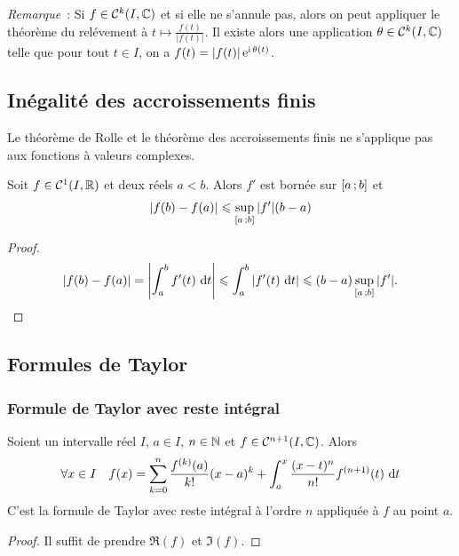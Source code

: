 \emph{Remarque}~: Si \(f \in \mathcal{C}^{k}(I,\mathbb{C})\) et si elle ne s'annule pas,
alors on peut appliquer le théorème du relévement à \(t \longmapsto
\frac{f(t)}{|f(t)|}\). Il existe alors une application \(\theta \in
\mathcal{C}^{k}(I,\mathbb{C})\) telle que pour tout \(t \in I\), on a \(f(t) = |f(t)|\operatorname{e}^{\operatorname{i}
\theta(t)}\).

\subsection{Inégalité des accroissements finis}

\danger Le théorème de Rolle et le théorème des accroissements finis ne
s'applique pas aux fonctions à valeurs complexes.

\begin{prop}
  Soit \(f \in \mathcal{C}^{1}(I,\mathbb{R})\) et deux réels \(a<b\). Alors \(f'\) est bornée
  sur \(\left[ a \, ; {} b \right]\) et
  \begin{equation}
    |f(b)-f(a)| \leqslant \sup\limits_{\left[ a \, ; {} b \right]}|f'|(b-a)
  \end{equation}
\end{prop}
\begin{proof}
  \begin{equation}
    |f(b)-f(a)| = \left|\int_a^b f'(t)\,\mathop{}\mathopen{}\mathrm{d} t\right| \leqslant \int_a^b
    |f'(t)\,\mathop{}\mathopen{}\mathrm{d} t| \leqslant (b-a) \sup\limits_{\left[ a \, ; {} b \right]}|f'|.
  \end{equation}
\end{proof}

\subsection{Formules de Taylor}

\subsubsection{Formule de Taylor avec reste intégral}

\begin{theo}
  Soient un intervalle réel \(I\), \(a \in I\), \(n \in \mathbb{N}\) et \(f \in
  \mathcal{C}^{{n+1}}(I,\mathbb{C})\). Alors
  \begin{equation}
    \forall x \in I \quad f(x) = \sum_{k = 0}^n \frac{f^{(k)}(a)}{k!}(x-a)^k +
    \int_a^x \frac{(x-t)^n}{n!} f^{(n+1)}(t)\,\mathop{}\mathopen{}\mathrm{d} t
  \end{equation}
  C'est la formule de Taylor avec reste intégral à l'ordre \(n\) appliquée à
  \(f\) au point \(a\).
\end{theo}
\begin{proof}
  Il suffit de prendre \(\Re(f)\) et \(\Im(f)\).
\end{proof}

